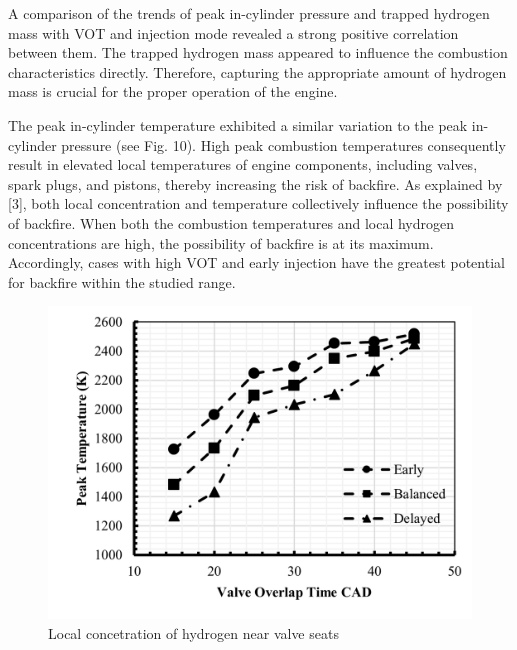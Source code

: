 \documentclass[conference]{IEEEtran}
\begin{document}
A comparison of the trends of peak in-cylinder pressure and trapped hydrogen mass with VOT and injection mode revealed a strong positive correlation between them. The trapped hydrogen mass appeared to influence the combustion characteristics directly. Therefore, capturing the appropriate amount of hydrogen mass is crucial for the proper operation of the engine.

The peak in-cylinder temperature exhibited a similar variation to the peak in-cylinder pressure (see Fig. 10). High peak combustion temperatures consequently result in elevated local temperatures of engine components, including valves, spark plugs, and pistons, thereby increasing the risk of backfire. As explained by [3], both local concentration and temperature collectively influence the possibility of backfire. When both the combustion temperatures and local hydrogen concentrations are high, the possibility of backfire is at its maximum. Accordingly, cases with high VOT and early injection have the greatest potential for backfire within the studied range.


\begin{figure}[htbp]
    \centerline{\includegraphics{plots and graphs/10.png}}
    \caption{Local concetration of hydrogen near valve seats}
    \label{plt_10}
    \end{figure}
\end{document}
